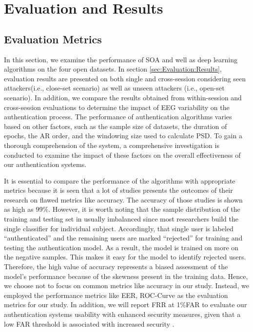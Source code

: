 \chapter{Evaluation and Results}
\label{ch:Evaluation}
\section{Evaluation Metrics}
In this section, we examine the performance of SOA and well as deep learning algorithms on the four open datasets. In section \ref{sec:Evaluation:Results}, evaluation results are presented on both single and cross-session considering seen attackers(i.e., close-set scenario) as well as unseen attackers (i.e., open-set scenario). In addition, we compare the results obtained from within-session and cross-session evaluations to determine the impact of EEG variability on the authentication process. The performance of authentication algorithms varies based on other factors, such as the sample size of datasets, the duration of epochs, the AR order, and the windowing size used to calculate PSD. To gain a thorough comprehension of the system, a comprehensive investigation is conducted to examine the impact of these factors on the overall effectiveness of our authentication systems.
\smallskip

It is essential to compare the performance of the algorithms with appropriate metrics because it is seen that a lot of studies presents the outcomes of their research on flawed metrics like accuracy. The accuracy of those studies is shown as high as 99$\%$. However, it is worth noting that the sample distribution of the training and testing set in usually imbalanced since most researchers build the single classifier for individual subject. Accordingly, that single user is labeled “authenticated” and the remaining users are marked “rejected” for training and testing the authentication model. As a result, the model is trained on more on the negative samples. This makes it easy for the model to identify rejected users. Therefore, the high value of accuracy represents a biased assessment of the model’s performance because of the skewness present in the training data. Hence, we choose not to focus on common metrics like accuracy in our study.
Instead, we employed the performance metrics like EER,  ROC-Curve as the evaluation metrics for our study. In addition, we will report FRR at 1$\%$FAR to evaluate our authentication systems usability with enhanced security measures, given that a low FAR threshold is associated with increased security \cite{arias2023performance}. 
